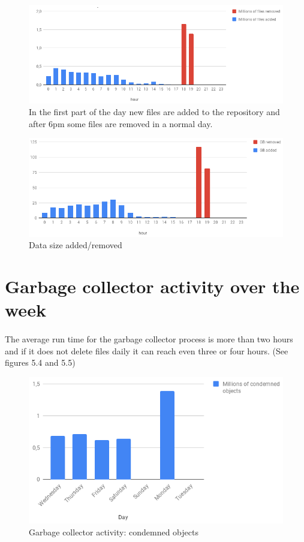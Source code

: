 \begin{figure}[h]
\centering
\includegraphics[scale=1.05]{figures/Average_publish_activity_over_the_week_per_hours}
\caption{In the first part of the day new files are added to the repository and after 6pm some files are removed in a normal day.}
\end{figure}
 
\begin{figure}[h]
\centering
\includegraphics[scale=1]{figures/Average_publish_activity_over_the_week_per_hours_data_size}
\caption{Data size added/removed}
\end{figure}


\newpage




\section{Garbage collector activity over the week}
\paragraph{}
The average run time for the garbage collector process is more than two hours and if it does not delete files daily it can reach even three or four hours. (See figures 5.4 and 5.5)
\begin{figure}[h]
\centering
\includegraphics[scale=1.3]{figures/Garbage_collector_activity}
\caption{Garbage collector activity: condemned objects}
\end{figure}

